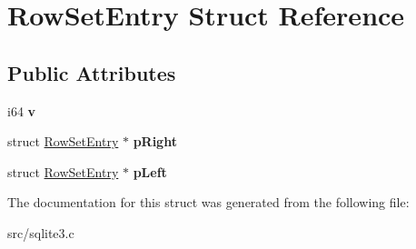 \hypertarget{struct_row_set_entry}{\section{Row\-Set\-Entry Struct Reference}
\label{struct_row_set_entry}
}
\subsection*{Public Attributes}
\begin{DoxyCompactItemize}
\item 
\hypertarget{struct_row_set_entry_ac72670935246f1bff5e4d96703574071}{i64 {\bfseries v}}\label{struct_row_set_entry_ac72670935246f1bff5e4d96703574071}

\item 
\hypertarget{struct_row_set_entry_ac39c09525dd24f42af522587d1bc5026}{struct \hyperlink{struct_row_set_entry}{Row\-Set\-Entry} $\ast$ {\bfseries p\-Right}}\label{struct_row_set_entry_ac39c09525dd24f42af522587d1bc5026}

\item 
\hypertarget{struct_row_set_entry_a59365203c30ce782ae38e534c90db14b}{struct \hyperlink{struct_row_set_entry}{Row\-Set\-Entry} $\ast$ {\bfseries p\-Left}}\label{struct_row_set_entry_a59365203c30ce782ae38e534c90db14b}

\end{DoxyCompactItemize}


The documentation for this struct was generated from the following file\-:\begin{DoxyCompactItemize}
\item 
src/sqlite3.\-c\end{DoxyCompactItemize}
